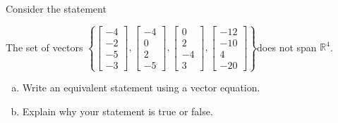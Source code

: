 
\begin{exerciseStatement}


Consider the statement 
\begin{center}\begin{minipage}{0.8\textwidth}
 The set of vectors \( \left\{ \left[\begin{array}{c}
-4 \\
-2 \\
-5 \\
-3
\end{array}\right] , \left[\begin{array}{c}
-4 \\
0 \\
2 \\
-5
\end{array}\right] , \left[\begin{array}{c}
0 \\
2 \\
-4 \\
3
\end{array}\right] , \left[\begin{array}{c}
-12 \\
-10 \\
4 \\
-20
\end{array}\right] \right\} \)does not span \(\mathbb{R}^4\). 
\end{minipage}\end{center}
    


\begin{enumerate}[(a)]
\item  Write an equivalent statement using a vector equation.
\item  Explain why your statement is true or false.
\end{enumerate}
    
\end{exerciseStatement}
    
